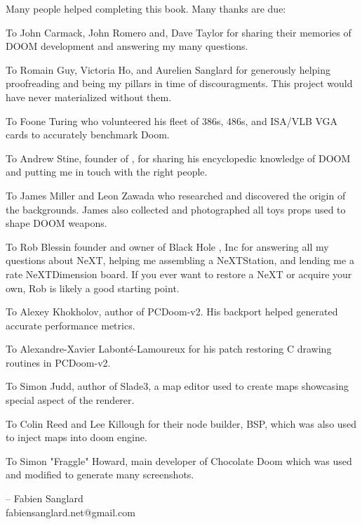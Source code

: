 Many people helped completing this book. Many thanks are due:\\
\par
To John Carmack, John Romero and, Dave Taylor for sharing their memories of DOOM development and answering my many questions.\\
\par
To Romain Guy, Victoria Ho, and Aurelien Sanglard for generously helping proofreading and being my pillars in time of discouragments. This project would have never materialized without them.\\ 
\par
To Foone Turing who volunteered his fleet of 386s, 486s, and ISA/VLB VGA cards to accurately benchmark Doom.\\
\par
To Andrew Stine, founder of , for sharing his encyclopedic knowledge of DOOM and putting me in touch with the right people.\\
\par
To James Miller and Leon Zawada who researched and discovered the origin of the backgrounds. James also collected and photographed all toys props used to shape DOOM weapons.\\
\par
To Rob Blessin founder and owner of Black Hole , Inc for answering all my questions about NeXT, helping me assembling a NeXTStation, and lending me a rate NeXTDimension board. If you ever want to restore a NeXT or acquire your own, Rob is likely a good starting point.\\
\par
To Alexey Khokholov, author of PCDoom-v2. His backport helped generated accurate performance metrics.\\
\par
To Alexandre-Xavier Labont\'e-Lamoureux for his patch restoring C drawing routines in PCDoom-v2.\\
\par
To Simon Judd, author of Slade3, a map editor used to create maps showcasing special aspect of the renderer.\\
\par
To Colin Reed and Lee Killough for their node builder, BSP, which was also used to inject maps into doom engine.\\
\par
To Simon "Fraggle" Howard, main developer of Chocolate Doom which was used and modified to generate many screenshots.\\
\par
-- Fabien Sanglard\\
fabiensanglard.net@gmail.com
